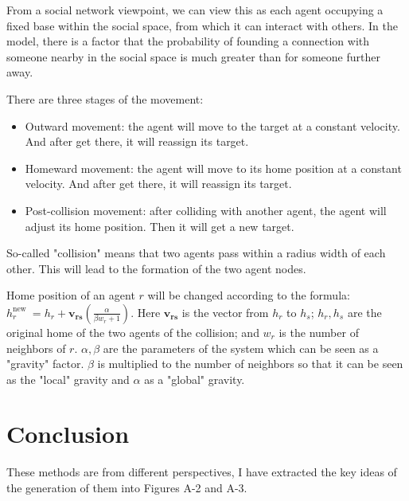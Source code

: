 \begin{survey}
From a social network viewpoint, we can view this as each agent
occupying a fixed base within the social space, from which it can
interact with others. In the model, there is a factor that the
probability of founding a connection with someone nearby in the social
space is much greater than for someone further away.

There are three stages of the movement:

\begin{itemize}
\item
  Outward movement: the agent will move to the target at a constant
  velocity. And after get there, it will reassign its target.
\item
  Homeward movement: the agent will move to its home position at a
  constant velocity. And after get there, it will reassign its target.
\item
  Post-collision movement: after colliding with another agent, the agent
  will adjust its home position. Then it will get a new target.
\end{itemize}

\vspace{0.2cm}

So-called "collision" means that two agents pass within a radius width
of each other. This will lead to the formation of the two agent nodes.

Home position of an agent \(r\) will be changed according to the
formula:
\(h_{r}^{\text {new }}=h_{r}+\boldsymbol{v}_{\boldsymbol{r s}}\left(\frac{\alpha}{\beta w_{r}+1}\right)\).
Here \(\boldsymbol{v}_{\boldsymbol{r s}}\) is the vector from \(h_r\) to
\(h_s\); \(h_r, h_s\) are the original home of the two agents of the
collision; and \(w_r\) is the number of neighbors of \(r\).
\(\alpha, \beta\) are the parameters of the system which can be seen as
a "gravity" factor. \(\beta\) is multiplied to the number of neighbors
so that it can be seen as the "local" gravity and \(\alpha\) as a
"global" gravity.

\section{Conclusion}


These methods are from different perspectives, I have extracted the key
ideas of the generation of them into Figures A-2 and A-3.


\end{survey}
